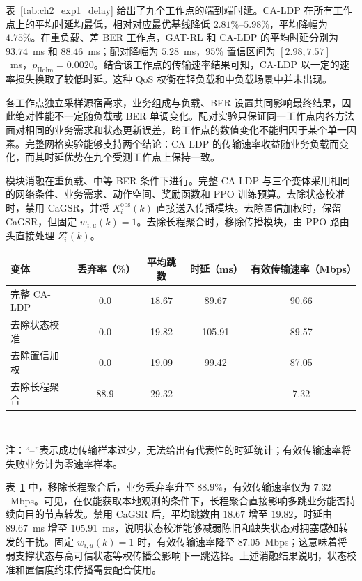 表~\ref{tab:ch2_exp1_delay} 给出了九个工作点的端到端时延。CA-LDP 在所有工作点上的平均时延均最低，相对对应最优基线降低 $2.81\%$--$5.98\%$，平均降幅为 $4.75\%$。在重负载、差 BER 工作点，GAT-RL 和 CA-LDP 的平均时延分别为 $93.74$~ms 和 $88.46$~ms；配对降幅为 $5.28$~ms，95\% 置信区间为 $[2.98,7.57]$~ms，$p_{\mathrm{Holm}}=0.0020$。结合该工作点的传输速率结果可知，CA-LDP 以一定的速率损失换取了较低时延。这种 QoS 权衡在轻负载和中负载场景中并未出现。

各工作点独立采样源宿需求，业务组成与负载、BER 设置共同影响最终结果，因此绝对性能不一定随负载或 BER 单调变化。配对实验只保证同一工作点内各方法面对相同的业务需求和状态更新误差，跨工作点的数值变化不能归因于某个单一因素。完整网格实验能够支持两个结论：CA-LDP 的传输速率收益随业务负载而变化，而其时延优势在九个受测工作点上保持一致。

模块消融在重负载、中等 BER 条件下进行。完整 CA-LDP 与三个变体采用相同的网络条件、业务需求、动作空间、奖励函数和 PPO 训练预算。去除状态校准时，禁用 CaGSR，并将 $X_i^{\mathrm{obs}}(k)$ 直接送入传播模块。去除置信加权时，保留 CaGSR，但固定 $w_{i,u}(k)=1$。去除长程聚合时，移除传播模块，由 PPO 路由头直接处理 $Z_i^\star(k)$。

\begin{table}[!htp]
\centering
{}
\label{tab:ch2_ablation}
\footnotesize
\setlength{\tabcolsep}{7pt}
\renewcommand{\arraystretch}{1.2}
\begin{tabular}{lcccc}
\hline
变体 & 丢弃率（\%） & 平均跳数 & 时延（ms） & 有效传输速率（Mbps） \\
\hline
完整 CA-LDP & $\mathbf{0.0}$ & $\mathbf{18.67}$ & $\mathbf{89.67}$ & $\mathbf{90.66}$ \\
去除状态校准 & 0.0 & 19.82 & 105.91 & 89.57 \\
去除置信加权 & 0.0 & 19.09 & 99.42 & 87.05 \\
去除长程聚合 & 88.9 & 29.32 & -- & 7.32 \\
\hline
\end{tabular}
\\[1mm]
\begin{minipage}{0.92\linewidth}
\footnotesize
注：“--”表示成功传输样本过少，无法给出有代表性的时延统计；有效传输速率将失败业务计为零速率样本。
\end{minipage}
\end{table}

表~\ref{tab:ch2_ablation} 中，移除长程聚合后，业务丢弃率升至 $88.9\%$，有效传输速率仅为 $7.32$~Mbps。可见，在仅能获取本地观测的条件下，长程聚合直接影响多跳业务能否持续向目的节点转发。禁用 CaGSR 后，平均跳数由 $18.67$ 增至 $19.82$，时延由 $89.67$~ms 增至 $105.91$~ms，说明状态校准能够减弱陈旧和缺失状态对拥塞感知转发的干扰。固定 $w_{i,u}(k)=1$ 时，有效传输速率降至 $87.05$~Mbps；这意味着将弱支撑状态与高可信状态等权传播会影响下一跳选择。上述消融结果说明，状态校准和置信度约束传播需要配合使用。

